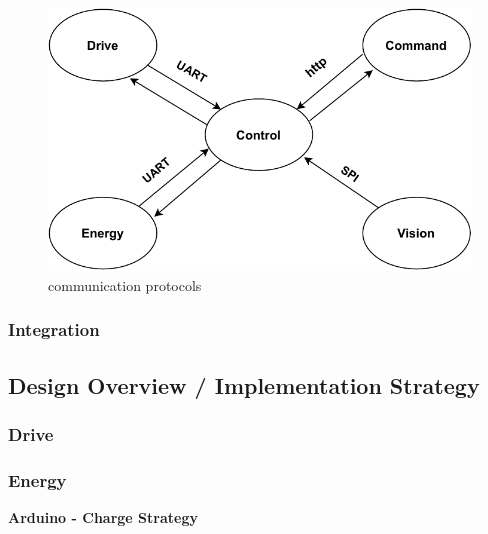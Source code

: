 \documentclass[10pt,twoside]{article}
\begin{document}
\begin{figure}[hbt!]
    \centering
    \includegraphics[scale=0.40]{esp32_comms.pdf}
    \captionsetup{justification=centering}
    \caption{communication protocols}
\end{figure}


\subsubsection{Integration}

\newpage
\subsection{Design Overview / Implementation Strategy}

\subsubsection{Drive}

\subsubsection{Energy}
\textbf{Arduino - Charge Strategy}
\end{document}
